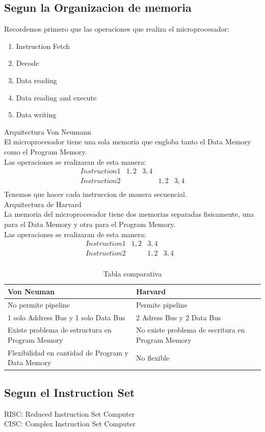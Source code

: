 \documentclass{report}
\begin{document}
\subsection{Segun la Organizacion de memoria}
Recordemos primero que las operaciones que realiza el microprocesador:
\begin{enumerate}
	\item Instruction Fetch
	\item Decode
	\item Data reading
	\item Data reading and execute
	\item Data writing
\end{enumerate}
{\large Arquitectura Von Neumann} \\
El microprocesador tiene una sola memoria que engloba tanto el Data Memory como el Program Memory. \\
Las operaciones se realizaran de esta manera:
\[
	\begin{array}{l|l|l|l|l}
		Instruction1 & 1,2 & 3,4 &     &     \\
		Instruction2 &     &     & 1,2 & 3,4 \\
	\end{array}
\]
Tenemos que hacer cada instruccion de manera secuencial. \\

{\large Arquitectura de Harvard} \\
La memoria del microprocesador tiene dos memorias separadas fisicamente, una para el Data Memory y otra para el Program Memory. \\
Las operaciones se realizaran de esta manera:
\[
	\begin{array}{l|l|l|l|l}
		Instruction1 & 1,2 & 3,4 &     & \\
		Instruction2 &     & 1,2 & 3,4 & \\
	\end{array}
\]
\newpage

\begin{table}[ht]
	\centering
	\begin{tabular}{p{0.5\linewidth}|p{0.5\linewidth}}
		Von Neuman                                        & Harvard                                           \\ \hline
		No permite pipeline                               & Permite pipeline                                  \\ \hline
		1 solo Address Bus y 1 solo Data Bus              & 2 Adress Bus y 2 Data Bus                         \\ \hline
		Existe problema de estructura en Program Memory   & No existe problema de escritura en Program Memory \\ \hline
		Flexibilidad en cantidad de Program y Data Memory & No flexible                                       \\
	\end{tabular}
	\caption{Tabla comparativa}
	\label{tab:clas_uP_org_mem}
\end{table}

\subsection{Segun el Instruction Set}
{\large RISC}: Reduced Instruction Set Computer \\

{\large CISC}: Complex Instruction Set Computer
\end{document}
